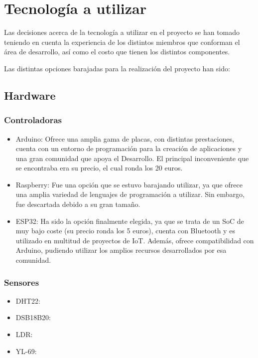 \documentclass[runningheads]{llncs}
\begin{document}
\section{Tecnología a utilizar}
Las decisiones acerca de la tecnología a utilizar en el proyecto se han tomado 
teniendo en cuenta la experiencia de los distintos miembros que conforman el 
área de desarrollo, así como el costo que tienen los distintos componentes.

\newline
Las distintas opciones barajadas para la realización del proyecto han sido:

\subsection*{Hardware}
\subsubsection*{Controladoras}
\begin{itemize}
    \item Arduino: Ofrece una amplia gama de placas, con distintas prestaciones, cuenta con un entorno de programación para la creación de aplicaciones y una gran comunidad que apoya el Desarrollo. El principal inconveniente que se encontraba era su precio, el cual ronda los 20 euros.
    
    \item Raspberry: Fue una opción que se estuvo barajando utilizar, ya que ofrece una amplia variedad de lenguajes de programación a utilizar. Sin embargo, fue descartada debido a su gran tamaño.
    
    \item ESP32: Ha sido la opción finalmente elegida, ya que se trata de un SoC de muy bajo coste (su precio ronda los 5 euros), cuenta con Bluetooth y es utilizado en multitud de proyectos de IoT. Además, ofrece compatibilidad con Arduino, pudiendo utilizar los amplios recursos desarrollados por esa comunidad.
\end{itemize}

\subsubsection*{Sensores}
\begin{itemize}
    \item DHT22:
    \item DSB18B20:
    \item LDR:
    \item YL-69:
\end{itemize}
\end{document}
